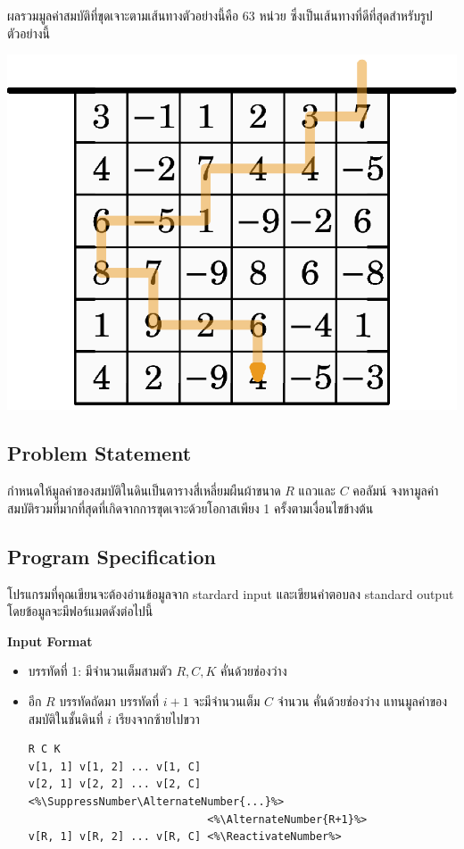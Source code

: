 ผลรวมมูลค่าสมบัติที่ขุดเจาะตามเส้นทางตัวอย่างนี้คือ 63 หน่วย ซึ่งเป็นเส้นทางที่ดีที่สุดสำหรับรูปตัวอย่างนี้
\begin{center}
    \vspace*{-1.5\baselineskip}
    \includegraphics[scale=0.6]{figures/coding_descendingdrills_02.eps}
\end{center}

\subsection*{\sectionfont\upshape Problem Statement}

กำหนดให้มูลค่าของสมบัติในดินเป็นตารางสี่เหลี่ยมผืนผ้าขนาด $R$ แถวและ $C$ คอลัมน์ 
จงหามูลค่าสมบัติรวมที่มากที่สุดที่เกิดจากการขุดเจาะด้วยโอกาสเพียง 1 ครั้งตามเงื่อนไขข้างต้น

\subsection*{\sectionfont\upshape Program Specification}

โปรแกรมที่คุณเขียนจะต้องอ่านข้อมูลจาก stardard input 
และเขียนคำตอบลง standard output โดยข้อมูลจะมีฟอร์แมตดังต่อไปนี้

\bigskip\noindent
{\sectionfont\bfseries Input Format}
\begin{itemize}
\item บรรทัดที่ 1: มีจำนวนเต็มสามตัว $R, C, K$ คั่นด้วยช่องว่าง
\item อีก $R$ บรรทัดถัดมา บรรทัดที่ $i+1$ จะมีจำนวนเต็ม $C$ จำนวน คั่นด้วยช่องว่าง แทนมูลค่าของสมบัติในชั้นดินที่ $i$ เรียงจากซ้ายไปขวา
\begin{lstlisting}
R C K
v[1, 1] v[1, 2] ... v[1, C]
v[2, 1] v[2, 2] ... v[2, C] <%\SuppressNumber\AlternateNumber{...}%>
                            <%\AlternateNumber{R+1}%>
v[R, 1] v[R, 2] ... v[R, C] <%\ReactivateNumber%>
\end{lstlisting}
\end{itemize}

